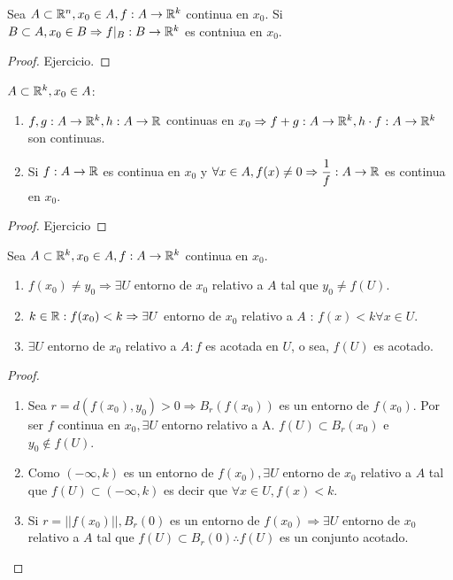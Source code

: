 \begin{prop}
  Sea $A \subset \mathbb{R}^n, x_0 \in A, f: A \to \mathbb{R}^k$ continua en $x_0$. Si $B \subset A, x_0 \in B \Rightarrow f|_B: B \to \mathbb{R}^k$ es contniua en $x_0$.
  \begin{proof}
    Ejercicio.
  \end{proof}
\end{prop}

\begin{prop}
  $A \subset \mathbb{R}^k, x_0 \in A$:
  \begin{enumerate}
    \item $f, g: A \to \mathbb{R}^k, h: A \to \mathbb{R}$ continuas en $x_0 \Rightarrow f+g: A \to \mathbb{R}^k, h \cdot f: A \to \mathbb{R}^k$ son continuas.
    \item Si $f: A \to \mathbb{R}$ es continua en $x_0$ y $\forall x \in A, f(x) \neq 0 \Rightarrow \dfrac{1}{f}: A \to \mathbb{R}$ es continua en $x_0$.
  \end{enumerate}

  \begin{proof}
    Ejercicio
  \end{proof}
\end{prop}

\begin{prop}
  Sea $A \subset \mathbb{R}^k, x_0 \in A, f: A \to \mathbb{R}^k$ continua en $x_0$.
  \begin{enumerate}
    \item $f(x_0) \neq y_0 \Rightarrow \exists U$ entorno de $x_0$ relativo a $A$ tal que $y_0 \neq f(U)$.
    \item $k \in \mathbb{R} : f(x_0) < k \Rightarrow \exists U$ entorno de $x_0$ relativo a $A$ : $f(x) < k \forall x \in U$.
    \item $\exists U$ entorno de $x_0$ relativo a $A : f$ es acotada en $U$, o sea, $f(U)$ es acotado. 
  \end{enumerate}

  \begin{proof}
    \begin{enumerate}
      \item Sea $r = d(f(x_0), y_0) > 0 \Rightarrow B_r(f(x_0))$ es un entorno de $f(x_0)$. Por ser $f$ continua en $x_0, \exists U$ entorno relativo a A. $f(U) \subset B_r(x_0)$ e $y_0 \notin f(U)$.
      \item Como $(-\infty, k)$ es un entorno de $f(x_0), \exists U$ entorno de $x_0$ relativo a $A$ tal que $f(U) \subset (-\infty, k)$ es decir que $\forall x \in U, f(x) < k$.
      \item Si $r = ||f(x_0)||, B_r(0)$ es un entorno de $f(x_0) \Rightarrow \exists U$ entorno de $x_0$ relativo a $A$ tal que $f(U) \subset B_r(0) \therefore f(U)$ es un conjunto acotado.
    \end{enumerate}
  \end{proof}
\end{prop}

